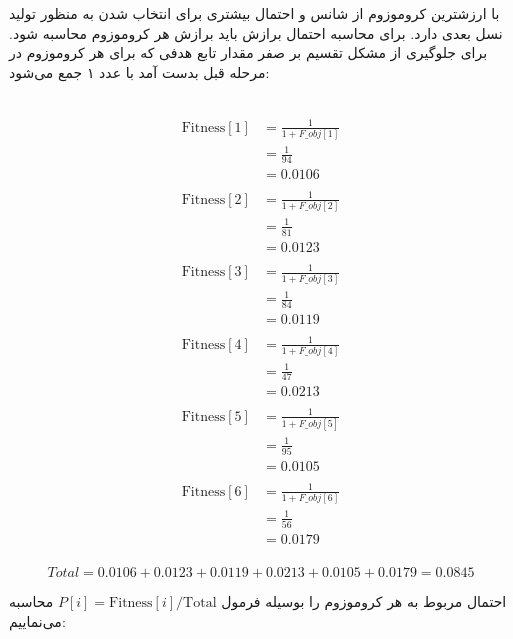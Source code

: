 \documentclass[11pt]{article}
\begin{document}
با ارزشترین کروموزوم از شانس و احتمال بیشتری برای انتخاب شدن به منظور تولید نسل بعدی دارد. برای محاسبه احتمال برازش باید برازش هر کروموزوم محاسبه شود. برای جلوگیری از مشکل تقسیم بر صفر مقدار تابع هدفی که برای هر کروموزوم در مرحله قبل بدست آمد با عدد  ۱ جمع می‌شود: 

\\

\[
\begin{align*} 
\text{Fitness}[1] &= \frac{1}{1+F\_obj[1]} \\ 
&= \frac{1}{94} \\ 
&= 0.0106 \\ 
\\ 
\text{Fitness}[2] &= \frac{1}{1+F\_obj[2]} \\ 
&= \frac{1}{81} \\ 
&= 0.0123 \\ 
\\ 
\text{Fitness}[3] &= \frac{1}{1+F\_obj[3]} \\
&= \frac{1}{84} \\ 
&= 0.0119 \\ 
\\ 
\text{Fitness}[4] &= \frac{1}{1+F\_obj[4]} \\ 
&= \frac{1}{47} \\ 
&= 0.0213 \\ 
\\
\text{Fitness}[5] &= \frac{1}{1+F\_obj[5]} \\  
&= \frac{1}{95} \\ 
&= 0.0105 \\ 
\\ 
\text{Fitness}[6] &= \frac{1}{1+F\_obj[6]} \\ 
&= \frac{1}{56} \\ 
&= 0.0179 \\
\end{align*}
\]


\[
Total=0.0106+0.0123+0.0119+0.0213+0.0105+0.0179=0.0845
\]

احتمال مربوط به هر کروموزوم را بوسیله فرمول 
$P[i] = \text{Fitness}[i] / \text{Total}$
 محاسبه می‌نماییم:
 
\end{document}
